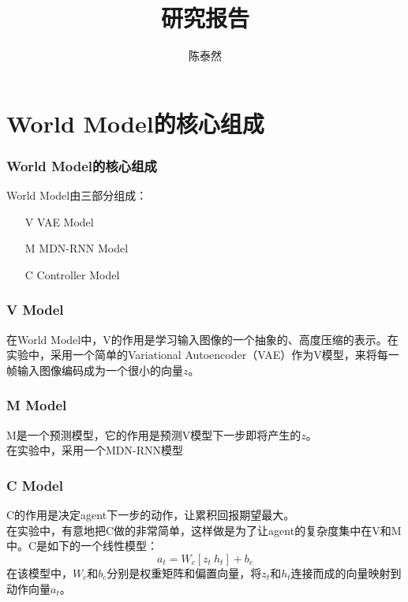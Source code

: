 \documentclass{beamer}
\title{研究报告}
\author{陈泰然}
\institute{USTC nelslip}
\begin{document}
	\frame{\titlepage}
	
	
	
	\section{World Model的核心组成}
	
	\begin{frame}
		\frametitle{World Model的核心组成}
		World Model由三部分组成：
		\begin{itemize}
			\item[V] VAE Model
			\item[M] MDN-RNN Model
			\item[C] Controller Model
		\end{itemize}
	\end{frame}
	
	\begin{frame}
		\frametitle{V Model}
		在World Model中，V的作用是学习输入图像的一个抽象的、高度压缩的表示。在实验中，采用一个简单的Variational Autoencoder（VAE）作为V模型，来将每一帧输入图像编码成为一个很小的向量$z$。
	\end{frame}

	\begin{frame}
		\frametitle{M Model}
		M是一个预测模型，它的作用是预测V模型下一步即将产生的$z$。\\
		在实验中，采用一个MDN-RNN模型
	\end{frame}
	
	\begin{frame}
		\frametitle{C Model}
		C的作用是决定agent下一步的动作，让累积回报期望最大。\\
		在实验中，有意地把C做的非常简单，这样做是为了让agent的复杂度集中在V和M中。C是如下的一个线性模型：
		\begin{equation}
			a_t=W_c[z_t\ h_t]+b_c
		\end{equation}
		在该模型中，$W_c$和$b_c$分别是权重矩阵和偏置向量，将$z_t$和$h_t$连接而成的向量映射到动作向量$a_t$。
	\end{frame}
\end{document}
